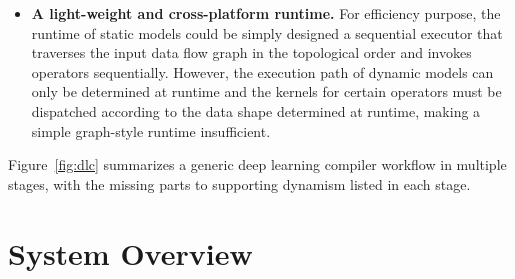 \begin{itemize}

\item \textbf{A light-weight and cross-platform runtime.} For efficiency purpose, the runtime of static models could be simply designed a sequential executor that traverses the input data flow graph in the topological order and invokes operators sequentially. However, the execution path of dynamic models can only be determined at runtime and the kernels for certain operators must be dispatched according to the data shape determined at runtime, making a simple graph-style runtime insufficient.
\end{itemize}

Figure~\ref{fig:dlc} summarizes a generic deep learning compiler workflow in multiple stages, with the missing parts to supporting dynamism listed in each stage.  %

\section{System Overview}
\label{sec:nimble-overview}


